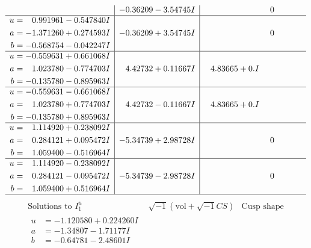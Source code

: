 \documentclass[1p]{elsarticle_modified}
\theoremstyle{definition}
\newcommand{\I}{\sqrt{-1}}
\begin{document}
$$\begin{array}{c|c|c}
 & -0.36209 - 3.54745 I & \phantom{-0.000000 } 0 \\ \hline\begin{aligned}
u &= \phantom{-}0.991961 - 0.547840 I \\
a &= -1.371260 + 0.274593 I \\
b &= -0.568754 - 0.042247 I\end{aligned}
 & -0.36209 + 3.54745 I & \phantom{-0.000000 } 0 \\ \hline\begin{aligned}
u &= -0.559631 + 0.661068 I \\
a &= \phantom{-}1.023780 - 0.774703 I \\
b &= -0.135780 - 0.895963 I\end{aligned}
 & \phantom{-}4.42732 + 0.11667 I & \phantom{-}4.83665 + 0. I\phantom{ +0.000000I} \\ \hline\begin{aligned}
u &= -0.559631 - 0.661068 I \\
a &= \phantom{-}1.023780 + 0.774703 I \\
b &= -0.135780 + 0.895963 I\end{aligned}
 & \phantom{-}4.42732 - 0.11667 I & \phantom{-}4.83665 + 0. I\phantom{ +0.000000I} \\ \hline\begin{aligned}
u &= \phantom{-}1.114920 + 0.238092 I \\
a &= \phantom{-}0.284121 + 0.095472 I \\
b &= \phantom{-}1.059400 - 0.516964 I\end{aligned}
 & -5.34739 + 2.98728 I & \phantom{-0.000000 } 0 \\ \hline\begin{aligned}
u &= \phantom{-}1.114920 - 0.238092 I \\
a &= \phantom{-}0.284121 - 0.095472 I \\
b &= \phantom{-}1.059400 + 0.516964 I\end{aligned}
 & -5.34739 - 2.98728 I & \phantom{-0.000000 } 0\\
 \hline 
 \end{array}$$\newpage$$\begin{array}{c|c|c}  
\text{Solutions to }I^u_{1}& \I (\text{vol} + \sqrt{-1}CS) & \text{Cusp shape}\\
 \hline 
\begin{aligned}
u &= -1.120580 + 0.224260 I \\
a &= -1.34807 - 1.71177 I \\
b &= -0.64781 - 2.48601 I\end{aligned}

\end{array}$$
\end{document}
